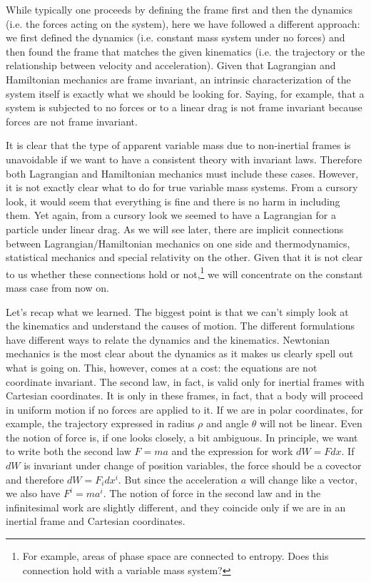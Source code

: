 While typically one proceeds by defining the frame first and then the dynamics (i.e. the forces acting on the system), here we have followed a different approach: we first defined the dynamics (i.e. constant mass system under no forces) and then found the frame that matches the given kinematics (i.e. the trajectory or the relationship between velocity and acceleration). Given that Lagrangian and Hamiltonian mechanics are frame invariant, an intrinsic characterization of the system itself is exactly what we should be looking for. Saying, for example, that a system is subjected to no forces or to a linear drag is not frame invariant because forces are not frame invariant.

It is clear that the type of apparent variable mass due to non-inertial frames is unavoidable if we want to have a consistent theory with invariant laws. Therefore both Lagrangian and Hamiltonian mechanics must include these cases. However, it is not exactly clear what to do for true variable mass systems. From a cursory look, it would seem that everything is fine and there is no harm in including them. Yet again, from a cursory look we seemed to have a Lagrangian for a particle under linear drag. As we will see later, there are implicit connections between Lagrangian/Hamiltonian mechanics on one side and thermodynamics, statistical mechanics and special relativity on the other. Given that it is not clear to us whether these connections hold or not,\footnote{For example, areas of phase space are connected to entropy. Does this connection hold with a variable mass system?} we will concentrate on the constant mass case from now on.

Let's recap what we learned. The biggest point is that we can't simply look at the kinematics and understand the causes of motion. The different formulations have different ways to relate the dynamics and the kinematics. Newtonian mechanics is the most clear about the dynamics as it makes us clearly spell out what is going on. This, however, comes at a cost: the equations are not coordinate invariant. The second law, in fact, is valid only for inertial frames with Cartesian coordinates. It is only in these frames, in fact, that a body will proceed in uniform motion if no forces are applied to it. If we are in polar coordinates, for example, the trajectory expressed in radius $\rho$ and angle $\theta$ will not be linear. Even the notion of force is, if one looks closely, a bit ambiguous. In principle, we want to write both the second law $F=ma$ and the expression for work $dW = F dx$. If $dW$ is invariant under change of position variables, the force should be a covector and therefore $dW = F_i dx^i$. But since the acceleration $a$ will change like a vector, we also have $F^i = m a^i$. The notion of force in the second law and in the infinitesimal work are slightly different, and they coincide only if we are in an inertial frame and Cartesian coordinates.


